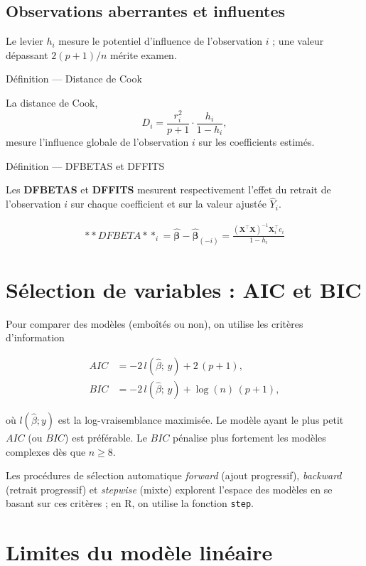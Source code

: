 \documentclass[
  french,
  letterpaper,
  DIV=11,
  numbers=noendperiod]{scrreprt}
\begin{document}
\subsection{Observations aberrantes et
influentes}\label{observations-aberrantes-et-influentes}

Le levier \(h_i\) mesure le potentiel d'influence de l'observation \(i\)
; une valeur dépassant \(2(p+1)/n\) mérite examen.

{Définition --- Distance de Cook}

La distance de Cook, \[D_i = \frac{r_i^2}{p+1}\cdot\frac{h_i}{1-h_i},\]
mesure l'influence globale de l'observation \(i\) sur les coefficients
estimés.

{Définition --- DFBETAS et DFFITS}

Les \textbf{DFBETAS} et \textbf{DFFITS} mesurent respectivement l'effet
du retrait de l'observation \(i\) sur chaque coefficient et sur la
valeur ajustée \(\hat Y_i\).

\[
\begin{aligned}
**DFBETA**_i=\hat{\boldsymbol{\beta}}- \hat{\boldsymbol{\beta}}_{(-i)}=\frac{(\boldsymbol{X}^\top\boldsymbol{X})^{-1}\boldsymbol{X}_i^\top e_i}{1-h_i}
\end{aligned}
\]

\section{Sélection de variables : AIC et
BIC}\label{suxe9lection-de-variables-aic-et-bic}

Pour comparer des modèles (emboîtés ou non), on utilise les critères
d'information

\[
\begin{aligned}
AIC &= -2\, l(\hat\beta;\, y) + 2\,(p+1),\\
BIC &= -2\, l(\hat\beta;\, y) + \log(n)\,(p+1),
\end{aligned}
\]

où \(l(\hat\beta; y)\) est la log-vraisemblance maximisée. Le modèle
ayant le plus petit \(AIC\) (ou \(BIC\)) est préférable. Le \(BIC\)
pénalise plus fortement les modèles complexes dès que \(n \geq 8\).

Les procédures de sélection automatique \emph{forward} (ajout
progressif), \emph{backward} (retrait progressif) et \emph{stepwise}
(mixte) explorent l'espace des modèles en se basant sur ces critères ;
en R, on utilise la fonction \texttt{step}.

\section{Limites du modèle
linéaire}\label{limites-du-moduxe8le-linuxe9aire}
\end{document}
